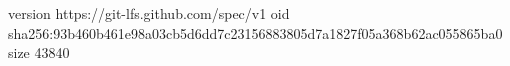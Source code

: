 version https://git-lfs.github.com/spec/v1
oid sha256:93b460b461e98a03cb5d6dd7c23156883805d7a1827f05a368b62ac055865ba0
size 43840
